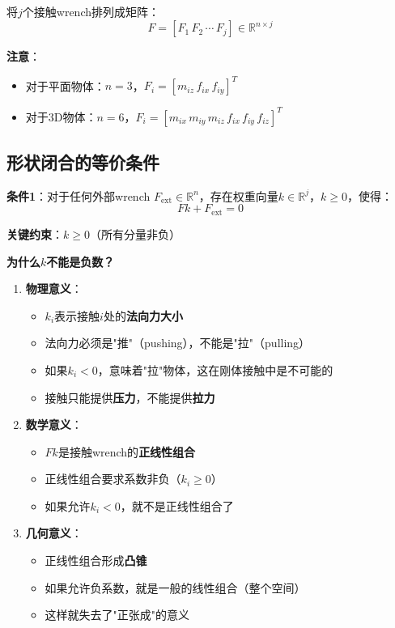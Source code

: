 \documentclass[12pt,a4paper]{article}
\begin{document}
将$j$个接触wrench排列成矩阵：
\begin{equation}
F = [F_1 \, F_2 \, \cdots \, F_j] \in \mathbb{R}^{n \times j}
\end{equation}

\textbf{注意}：
\begin{itemize}
\item 对于平面物体：$n = 3$，$F_i = [m_{iz} \, f_{ix} \, f_{iy}]^T$
\item 对于3D物体：$n = 6$，$F_i = [m_{ix} \, m_{iy} \, m_{iz} \, f_{ix} \, f_{iy} \, f_{iz}]^T$
\end{itemize}

\subsection{形状闭合的等价条件}

\textbf{条件1}：对于任何外部wrench $F_{\text{ext}} \in \mathbb{R}^n$，存在权重向量$k \in \mathbb{R}^j$，$k \geq 0$，使得：
\begin{equation}
F k + F_{\text{ext}} = 0
\label{eq:form_closure_condition}
\end{equation}

\textbf{关键约束}：$k \geq 0$（所有分量非负）

\textbf{为什么$k$不能是负数？}

\begin{enumerate}
\item \textbf{物理意义}：
   \begin{itemize}
   \item $k_i$表示接触$i$处的\textbf{法向力大小}
   \item 法向力必须是"推"（pushing），不能是"拉"（pulling）
   \item 如果$k_i < 0$，意味着"拉"物体，这在刚体接触中是不可能的
   \item 接触只能提供\textbf{压力}，不能提供\textbf{拉力}
   \end{itemize}

\item \textbf{数学意义}：
   \begin{itemize}
   \item $F k$是接触wrench的\textbf{正线性组合}
   \item 正线性组合要求系数非负（$k_i \geq 0$）
   \item 如果允许$k_i < 0$，就不是正线性组合了
   \end{itemize}

\item \textbf{几何意义}：
   \begin{itemize}
   \item 正线性组合形成\textbf{凸锥}
   \item 如果允许负系数，就是一般的线性组合（整个空间）
   \item 这样就失去了"正张成"的意义
   \end{itemize}
\end{enumerate}
\end{document}
